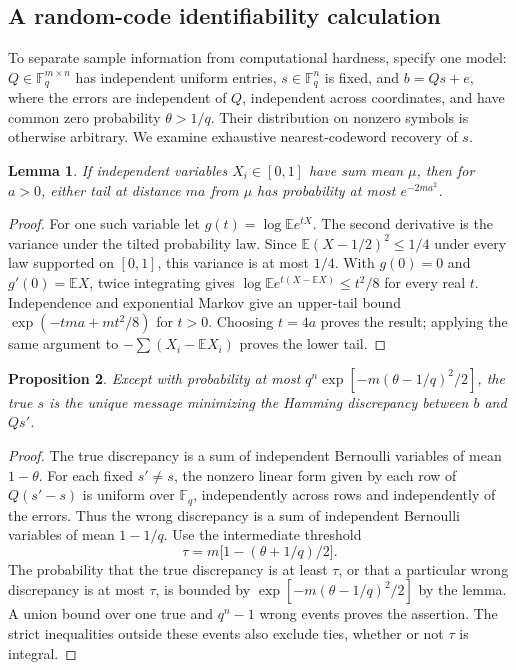 \documentclass[11pt]{article}
\newtheorem{proposition}{Proposition}
\newtheorem{lemma}[proposition]{Lemma}
\begin{document}
\subsection{A random-code identifiability calculation}
To separate sample information from computational hardness, specify one model: $Q\in\mathbb F_q^{m\times n}$ has independent uniform entries, $s\in\mathbb F_q^n$ is fixed, and $b=Qs+e$, where the errors are independent of $Q$, independent across coordinates, and have common zero probability $\theta>1/q$. Their distribution on nonzero symbols is otherwise arbitrary. We examine exhaustive nearest-codeword recovery of $s$.
\begin{lemma}
If independent variables $X_i\in[0,1]$ have sum mean $\mu$, then for $a>0$, either tail at distance $ma$ from $\mu$ has probability at most $e^{-2ma^2}$.
\end{lemma}
\begin{proof}
For one such variable let $g(t)=\log\mathbb E e^{tX}$. The second derivative is the variance under the tilted probability law. Since $\mathbb E(X-1/2)^2\le1/4$ under every law supported on $[0,1]$, this variance is at most $1/4$. With $g(0)=0$ and $g'(0)=\mathbb EX$, twice integrating gives $\log\mathbb E e^{t(X-\mathbb EX)}\le t^2/8$ for every real $t$. Independence and exponential Markov give an upper-tail bound $\exp(-tma+mt^2/8)$ for $t>0$. Choosing $t=4a$ proves the result; applying the same argument to $-\sum(X_i-\mathbb EX_i)$ proves the lower tail.
\end{proof}
\begin{proposition}
Except with probability at most $q^n\exp[-m(\theta-1/q)^2/2]$, the true $s$ is the unique message minimizing the Hamming discrepancy between $b$ and $Qs'$.
\end{proposition}
\begin{proof}
The true discrepancy is a sum of independent Bernoulli variables of mean $1-\theta$. For each fixed $s'\ne s$, the nonzero linear form given by each row of $Q(s'-s)$ is uniform over $\mathbb F_q$, independently across rows and independently of the errors. Thus the wrong discrepancy is a sum of independent Bernoulli variables of mean $1-1/q$. Use the intermediate threshold
\[
\tau=m\bigl[1-(\theta+1/q)/2\bigr].
\]
The probability that the true discrepancy is at least $\tau$, or that a particular wrong discrepancy is at most $\tau$, is bounded by $\exp[-m(\theta-1/q)^2/2]$ by the lemma. A union bound over one true and $q^n-1$ wrong events proves the assertion. The strict inequalities outside these events also exclude ties, whether or not $\tau$ is integral.
\end{proof}
\end{document}

